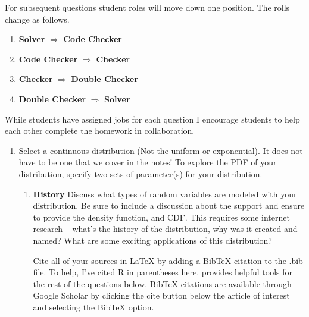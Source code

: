 \documentclass{article}\usepackage[]{graphicx}\usepackage[]{color}
\begin{document}
\noindent For subsequent questions student roles will move down one position. The rolls change as follows.
\begin{enumerate}
  \item \textbf{Solver} $\Longrightarrow$ \textbf{Code Checker}
  \item \textbf{Code Checker} $\Longrightarrow$ \textbf{Checker}
  \item \textbf{Checker} $\Longrightarrow$ \textbf{Double Checker}
  \item \textbf{Double Checker} $\Longrightarrow$ \textbf{Solver}
\end{enumerate}
While students have assigned jobs for each question I encourage students to help 
each other complete the homework in collaboration.
\newpage
\begin{enumerate}
  \item\label{Q1} Select a continuous distribution (Not the uniform or exponential). 
  It does not have to be one that we cover in the notes! To explore the PDF of your 
  distribution, specify two sets of parameter(s) for your distribution.
  \begin{enumerate}
  \item \textbf{History} Discuss what types of random variables are modeled with 
  your distribution. Be sure to include a discussion about the support and ensure 
  to provide the density function, and CDF. This requires some internet research 
  -- what's the history of the distribution, why was it created and named? What 
  are some exciting applications of this distribution?
  
  Cite all of your sources in LaTeX by adding a BibTeX citation to the .bib file. 
  To help, I've cited R \citep{R21} in parentheses here. \cite{R21} provides helpful 
  tools for the rest of the questions below. BibTeX citations are available through 
  Google Scholar by clicking the cite button below the article of  interest and 
  selecting the BibTeX option.\\
  

\end{enumerate}
\end{enumerate}
\end{document}
